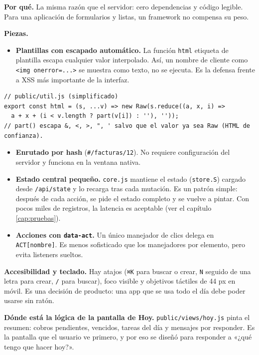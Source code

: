 \textbf{Por qué.} La misma razón que el servidor: cero dependencias y código legible. Para una aplicación de formularios y listas, un framework no compensa su peso.

\textbf{Piezas.}

\begin{itemize}
\tightlist
\item
  \textbf{Plantillas con escapado automático.} La función \texttt{html} etiqueta de plantilla escapa cualquier valor interpolado. Así, un nombre de cliente como \texttt{\textless{}img\ onerror=...\textgreater{}} se muestra como texto, no se ejecuta. Es la defensa frente a XSS más importante de la interfaz.
\end{itemize}

\begin{verbatim}
// public/util.js (simplificado)
export const html = (s, ...v) => new Raw(s.reduce((a, x, i) =>
  a + x + (i < v.length ? part(v[i]) : ''), ''));
// part() escapa &, <, >, ", ' salvo que el valor ya sea Raw (HTML de confianza).
\end{verbatim}

\begin{itemize}
\tightlist
\item
  \textbf{Enrutado por hash} (\texttt{\#/facturas/12}). No requiere configuración del servidor y funciona en la ventana nativa.
\item
  \textbf{Estado central pequeño.} \texttt{core.js} mantiene el estado (\texttt{store.S}) cargado desde \texttt{/api/state} y lo recarga tras cada mutación. Es un patrón simple: después de cada acción, se pide el estado completo y se vuelve a pintar. Con pocos miles de registros, la latencia es aceptable (ver el capítulo \ref{cap:pruebas}).
\item
  \textbf{Acciones con \texttt{data-act}.} Un único manejador de clics delega en \texttt{ACT{[}nombre{]}}. Es menos sofisticado que los manejadores por elemento, pero evita listeners sueltos.
\end{itemize}

\textbf{Accesibilidad y teclado.} Hay atajos (\texttt{⌘K} para buscar o crear, \texttt{N} seguido de una letra para crear, \texttt{/} para buscar), foco visible y objetivos táctiles de 44 px en móvil. Es una decisión de producto: una app que se usa todo el día debe poder usarse sin ratón.

\textbf{Dónde está la lógica de la pantalla de Hoy.} \texttt{public/views/hoy.js} pinta el resumen: cobros pendientes, vencidos, tareas del día y mensajes por responder. Es la pantalla que el usuario ve primero, y por eso se diseñó para responder a «¿qué tengo que hacer hoy?».

